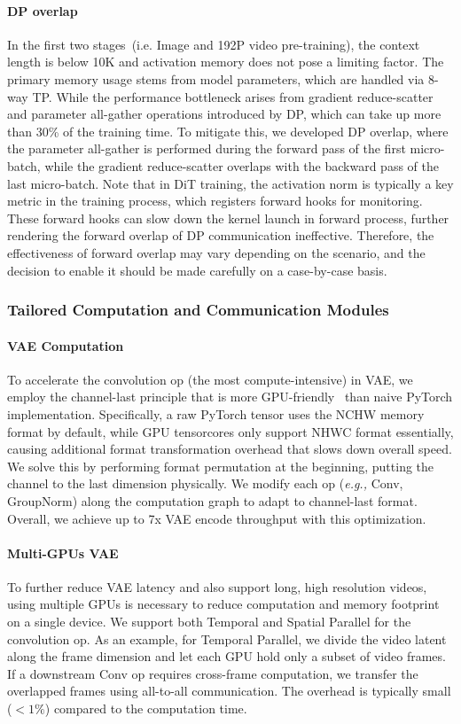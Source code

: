 \paragraph{DP overlap}
In the first two stages~(i.e. Image and 192P video pre-training), the context length is below 10K and activation memory does not pose a limiting factor. The primary memory usage stems from model parameters, which are handled via 8-way TP. While the performance bottleneck arises from gradient reduce-scatter and parameter all-gather operations introduced by DP, which can take up more than 30\% of the training time. To mitigate this, we developed DP overlap, where the parameter all-gather is performed during the forward pass of the first micro-batch, while the gradient reduce-scatter overlaps with the backward pass of the last micro-batch. Note that in DiT training, the activation norm is typically a key metric in the training process, which registers forward hooks for monitoring. These forward hooks can slow down the kernel launch in forward process, further rendering the forward overlap of DP communication ineffective. Therefore, the effectiveness of forward overlap may vary depending on the scenario, and the decision to enable it should be made carefully on a case-by-case basis.


\subsubsection{Tailored Computation and Communication Modules}

\paragraph{VAE Computation} 
To accelerate the convolution op (the most compute-intensive) in VAE, we employ the channel-last principle that is more GPU-friendly~\cite{channel_last} than naive PyTorch implementation. Specifically, a raw PyTorch tensor uses the NCHW memory format by default, while GPU tensorcores only support NHWC format essentially, causing additional format transformation overhead that slows down overall speed. We solve this by performing format permutation at the beginning, putting the channel to the last dimension physically. We modify each op (\textit{e.g.,} Conv, GroupNorm) along the computation graph to adapt to channel-last format. Overall, we achieve up to 7x VAE encode throughput with this optimization.

\paragraph{Multi-GPUs VAE} To further reduce VAE latency and also support long, high resolution videos, using multiple GPUs is necessary to reduce computation and memory footprint on a single device. We support both Temporal and Spatial Parallel for the convolution op. As an example, for Temporal Parallel, we divide the video latent along the frame dimension and let each GPU hold only a subset of video frames. If a downstream Conv op requires cross-frame computation, we transfer the overlapped frames using all-to-all communication. The overhead is typically small ($<1\%$) compared to the computation time.


